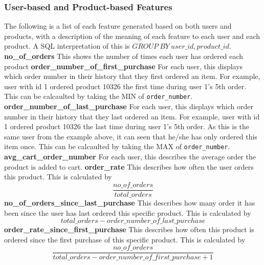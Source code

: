 \documentclass[12pt]{article}
\begin{document}
\subsubsection{User-based and Product-based Features}
The following is a list of each feature generated based on both users and products, with a description of the meaning of each feature to each user and each product. A SQL interpretation of this is $GROUP\ BY\ user\_id, product\_id$.
\newline\newline
{\textbf{no\_of\_orders}}
\newline
This shows the number of times each user has ordered each product
\newline\newline
{\textbf{order\_number\_of\_first\_purchase}}
\newline
For each user, this displays which order number in their history that they first ordered an item. For example, user with id 1 ordered product 10326 the first time during user 1's 5th order. This can be calcaulted by taking the MIN of \texttt{order\_number}.
\newline\newline
{\textbf{order\_number\_of\_last\_purchase}}
\newline
For each user, this displays which order number in their history that they last ordered an item. For example, user with id 1 ordered product 10326 the last time during user 1's 5th order. As this is the same user from the example above, it can seen that he/she has only ordered this item once. This can be calcaulted by taking the MAX of \texttt{order\_number}.
\newline\newline
{\textbf{avg\_cart\_order\_number}}
\newline
For each user, this describes the average order the product is added to cart.
\newline\newline
{\textbf{order\_rate}}
\newline
This describes how often the user orders this product. This is calculated by
\begin{equation}
    \frac
    {no\_of\_orders}
    {total\_orders}
\end{equation}
\newline\newline
{\textbf{no\_of\_orders\_since\_last\_purchase}}
\newline
This describes how many order it has been since the user has last ordered this specific product. This is calculated by
\begin{equation}
    total\_orders - order\_number\_of\_last\_purchase
\end{equation}
\newline\newline
{\textbf{order\_rate\_since\_first\_purchase}}
\newline
This describes how often this product is ordered since the first purchase of this specific product. This is calculated by
\begin{equation}
    \frac{no\_of\_orders}{total\_orders - order\_number\_of\_first\_purchase + 1}
\end{equation}
\end{document}
